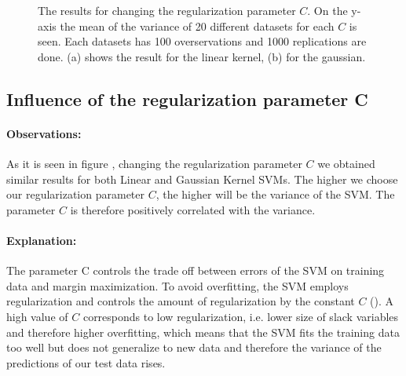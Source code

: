 \documentclass[a4paper]{article}
\begin{document}
\begin{figure}[!htb]
\begin{center}

\caption{The results for changing the regularization parameter $C$. On the y-axis the mean of the variance of 20 different datasets for each $C$ is seen. Each datasets has 100 overservations and 1000 replications are done. (a) shows the result for the linear kernel, (b) for the gaussian.}
\label{fig3}
\end{center}
\end{figure}



\subsection{Influence of the regularization parameter C}
\paragraph{Observations:}
As it is seen in figure \label{fig3}, changing the regularization parameter $C$ we obtained similar results for both Linear and Gaussian Kernel SVMs. The higher we choose our regularization parameter $C$, the higher will be the variance of the SVM. The parameter $C$ is therefore positively correlated with the variance.
\paragraph{Explanation:}
The parameter C controls the trade off between errors of the SVM on training data and margin maximization. To avoid overfitting, the SVM employs regularization and controls the amount of regularization by the constant $C$ (\cite{hastie_elements_2005}). A high value of $C$ corresponds to low regularization, i.e. lower size of slack variables and therefore higher overfitting, which means that the SVM fits the training data too well but does not generalize to new data and therefore the variance of the predictions of our test data rises.
\end{document}

